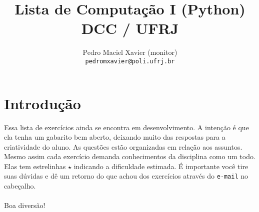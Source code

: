 \documentclass[12pt]{article}
\title{%
Lista de Computação I (Python) \\
{\normalsize DCC / UFRJ}
}
\author{%
Pedro Maciel Xavier (monitor)\\ 
\texttt{pedromxavier@poli.ufrj.br}
}
\begin{document}
	\maketitle
	\section*{Introdução}
	Essa lista de exercícios ainda se encontra em desenvolvimento. A intenção é que ela tenha um gabarito bem aberto, deixando muito das respostas para a criatividade do aluno. As questões estão organizadas em relação aos assuntos. Mesmo assim cada exercício demanda conhecimentos da disciplina como um todo. Elas tem estrelinhas $\star$ indicando a dificuldade estimada. É importante você tire suas dúvidas e dê um retorno do que achou dos exercícios através do \texttt{e-mail} no cabeçalho.
	~\\
	~\\
	Boa diversão! \par
	
	\cc
	
	\tableofcontents
	
	
\end{document}
